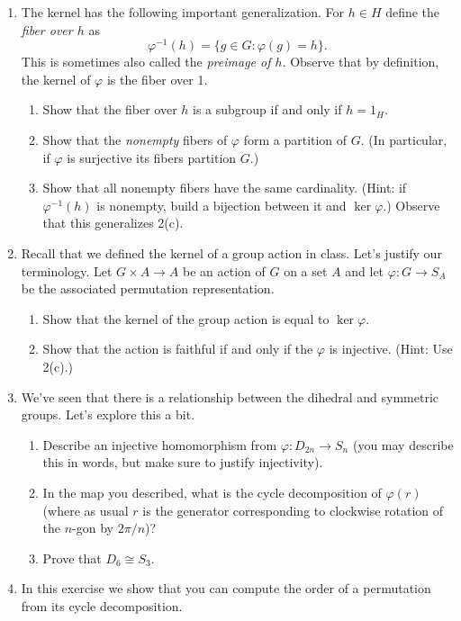 \documentclass[11pt]{article}
\begin{document}
\begin{enumerate}
\begin{enumerate}
  \end{enumerate}
  \item The kernel has the following important generalization.  For $h\in H$ define the \textit{fiber over $h$} as
  \[\varphi^{-1}(h) = \{g\in G:\varphi(g) = h\}.\]
  This is sometimes also called the \textit{preimage of $h$}.  Observe that by definition, the kernel of $\varphi$ is the fiber over 1.
  \begin{enumerate}
    \item{Show that the fiber over $h$ is a subgroup if and only if $h=1_H$.}
    \item{Show that the \textit{nonempty} fibers of $\varphi$ form a partition of $G$.  (In particular, if $\varphi$ is surjective its fibers partition $G$.)}
    \item{Show that all nonempty fibers have the same cardinality.  (Hint: if $\varphi^{-1}(h)$ is nonempty, build a bijection between it and $\ker\varphi$.)  Observe that this generalizes 2(c).}
  \end{enumerate}
  \item Recall that we defined the kernel of a group action in class.  Let's justify our terminology.  Let $G\times A\to A$ be an action of $G$ on a set $A$ and let $\varphi:G\to S_A$ be the associated permutation representation.
  \begin{enumerate}
    \item Show that the kernel of the group action is equal to $\ker\varphi$.
    \item Show that the action is faithful if and only if the $\varphi$ is injective.  (Hint: Use 2(c).)
  \end{enumerate}
  \item We've seen that there is a relationship between the dihedral and symmetric groups.  Let's explore this a bit.
  \begin{enumerate}
    \item Describe an injective homomorphism from $\varphi:D_{2n}\to S_n$ (you may describe this in words, but make sure to justify injectivity).
    \item In the map you described, what is the cycle decomposition of $\varphi(r)$ (where as usual $r$ is the generator corresponding to clockwise rotation of the $n$-gon by $2\pi/n$)?
    \item Prove that $D_6\cong S_3$.
  \end{enumerate}
  \item In this exercise we show that you can compute the order of a permutation from its cycle decomposition.

\end{enumerate}
\end{document}
